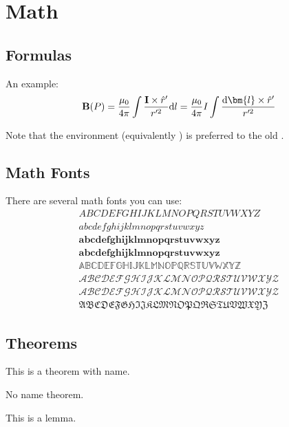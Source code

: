 \documentclass[showbib, lang=zh]{DeanReport}
\begin{document}
\section{Math}
\label{sec:math}

\subsection{Formulas}
An example:
\begin{displaymath}
    \mathbf{B}(P) = \frac{\mu_0}{4\pi}\int\frac{\mathbf{I}\times\hat{r}'}{r'^2}{\rm d}l = \frac{\mu_0}{4\pi} I \int \frac{{\rm d}\bm{l}\times \hat{r}'}{r'^2}
\end{displaymath}

Note that the  environment (equivalently \code{\textbackslash[...\textbackslash]}) is preferred to the old \code{\$\$}.

\subsection{Math Fonts}
There are several math fonts you can use:
\allowdisplaybreaks
\begin{align}
    ABCDEFGHIJKLMNOPQRSTUVWXYZ\\
    abcdefghijklmnopqrstuvwxyz\\
    \mathbf{abcdefghijklmnopqrstuvwxyz}\\
    \bm{abcdefghijklmnopqrstuvwxyz}\\
    \mathbb{ABCDEFGHIJKLMNOPQRSTUVWXYZ}\\
    \mathcal{ABCDEFGHIJKLMNOPQRSTUVWXYZ}\\
    \mathscr{ABCDEFGHIJKLMNOPQRSTUVWXYZ}\\
    \mathfrak{ABCDEFGHIJKLMNOPQRSTUVWXYZ}
\end{align}

\subsection{Theorems}

\begin{theorem}
    This is a theorem with name.
\end{theorem}

\begin{theorem}
    No name theorem.
\end{theorem}

\begin{lemma}
    This is a lemma.
\end{lemma}
\end{document}
